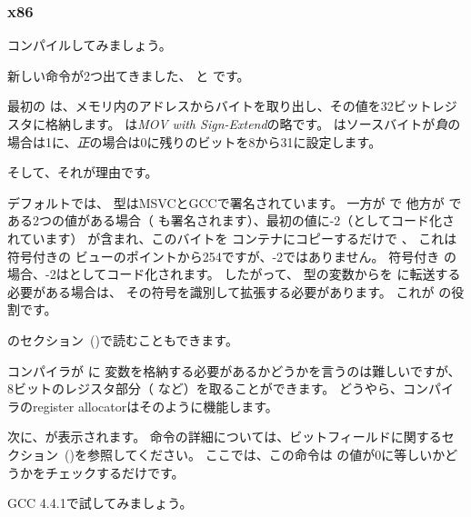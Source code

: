 ﻿\subsubsection{x86}


コンパイルしてみましょう。




新しい命令が2つ出てきました、 \MOVSX と \TEST です。

\label{MOVSX}

最初の \MOVSX は、メモリ内のアドレスからバイトを取り出し、その値を32ビットレジスタに格納します。 
\MOVSX は\emph{MOV with Sign-Extend}の略です。 
\MOVSX はソースバイトが\emph{負}の場合は1に、\emph{正}の場合は0に残りのビットを8から31に設定します。

そして、それが理由です。

デフォルトでは、 \Tchar 型はMSVCとGCCで署名されています。 一方が \Tchar で
他方が \Tint である2つの値がある場合（ \Tint も署名されます）、最初の値に-2（としてコード化されています）
が含まれ、このバイトを \Tint コンテナにコピーするだけで 、
これは符号付きの \Tint ビューのポイントから254ですが、-2ではありません。
符号付き \Tint の場合、-2はとしてコード化されます。 
したがって、 \Tchar 型の変数からを \Tint に転送する必要がある場合は、
その符号を識別して拡張する必要があります。 これが \MOVSX の役割です。

\q{\emph{\SignedNumbersSectionName}}のセクション~()で読むこともできます。

コンパイラが \EDX に \Tchar 変数を格納する必要があるかどうかを言うのは難しいですが、
8ビットのレジスタ部分（ \DL など）を取ることができます。 どうやら、コンパイラの\gls{register allocator}はそのように機能します。


次に、が表示されます。 
\TEST 命令の詳細については、ビットフィールドに関するセクション~()を参照してください。 
ここでは、この命令は \EDX の値が0に等しいかどうかをチェックするだけです。


GCC 4.4.1で試してみましょう。



